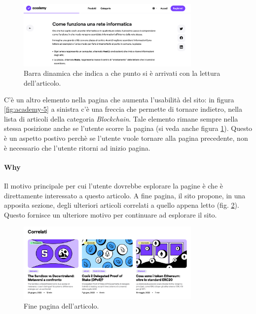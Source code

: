 \begin{figure}[H]
  \centering
  \includegraphics[width=0.80\textwidth]{res/images/internal-pages/academy/academy-6.png}
  \caption{Barra dinamica che indica a che punto si è arrivati con la 
  lettura dell'articolo.}
  \label{fig:academy-6}
\end{figure}

C'è un altro elemento nella pagina che aumenta l'usabilità del sito: 
in figura \ref{fig:academy-5} a sinistra c'è una freccia che permette di 
tornare indietro, nella lista di articoli della categoria 
\textit{Blockchain}. Tale elemento rimane sempre nella stessa posizione 
anche se l'utente scorre la pagina (si veda anche figura 
\ref{fig:academy-6}). Questo è un aspetto postivo perchè se l'utente vuole 
tornare alla pagina precedente, non è necessario che l'utente ritorni ad 
inizio pagina.

\paragraph{Why}

Il motivo principale per cui l'utente dovrebbe esplorare la pagine è che 
è direttamente interessato a questo articolo. A fine pagina, il sito 
propone, in una apposita sezione, degli ulteriori articoli correlati a 
quello appena letto (fig. \ref{fig:academy-7}). Questo fornisce un 
ulteriore motivo per continuare ad esplorare il sito.

\begin{figure}[H]
  \centering
  \includegraphics[width=0.80\textwidth]{res/images/internal-pages/academy/academy-7.png}
  \caption{Fine pagina dell'articolo.}
  \label{fig:academy-7}
\end{figure}

